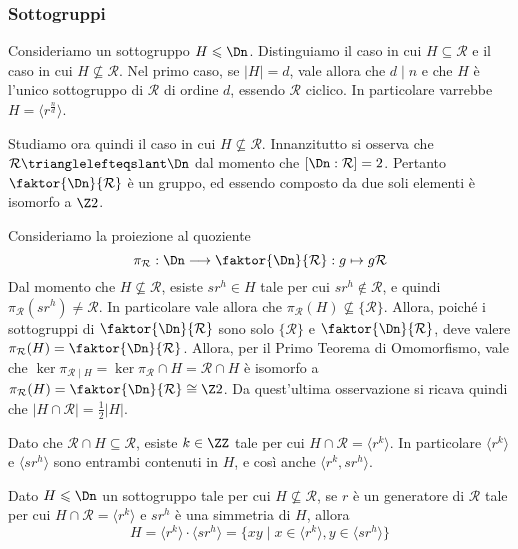 \documentclass[11pt]{scrartcl}
\begin{document}
	
	\subsubsection{Sottogruppi}
	
	Consideriamo un sottogruppo $H\leqslant \Dn$. Distinguiamo il caso
	in cui
	$H \subseteq \mathcal{R}$ e il caso in cui $H \nsubseteq \mathcal{R}$. Nel primo caso,
	se $\lvert H \rvert = d$, vale allora che $d\mid n$ e che $H$ è l'unico sottogruppo di $\mathcal{R}$ di ordine $d$, essendo
	$\mathcal{R}$ ciclico. In particolare varrebbe $H = \langle r^{\frac{n}{d}} \rangle$. \medskip
	
	
	Studiamo ora quindi il caso in cui $H \nsubseteq \mathcal{R}$.
	Innanzitutto si osserva che
	$\mathcal{R}\trianglelefteqslant \Dn$ dal momento che
	$[\Dn : \mathcal{R}] = 2$.
	Pertanto $\faktor{\Dn}{\mathcal{R}}$ è un gruppo, ed essendo
	composto da due soli elementi è isomorfo a
	$\Z2$. \medskip
	
	
	Consideriamo la proiezione al quoziente 
	\[
	\pi_{\mathcal{R}}: \Dn \longrightarrow \faktor{\Dn}{\mathcal{R}} : g \mapsto g\mathcal{R}
	\]
	Dal momento che $H \nsubseteq \mathcal{R}$, esiste $sr^h \in H$ tale per
	cui 
	$sr^h \notin \mathcal{R}$, e quindi $\pi_{\mathcal{R}}(sr^h) \neq \mathcal{R}$.
	In particolare vale allora che $\pi_{\mathcal{R}}(H) \nsubseteq \{\mathcal{R}\}$. Allora, poiché i 
	sottogruppi di $\faktor{\Dn}{\mathcal{R}}$ sono solo $\{\mathcal{R}\}$ e
	$\faktor{\Dn}{\mathcal{R}}$, deve valere $\pi_{\mathcal{R}}(H) = 
	\faktor{\Dn}{\mathcal{R}}$. Allora, per il Primo Teorema
	di Omomorfismo, vale che $\ker \pi_{\mathcal{R}\mid H} = 
	\ker \pi_{\mathcal{R}} \cap H = \mathcal{R} \cap H$ è isomorfo
	a $\pi_{\mathcal{R}}(H) = \faktor{\Dn}{\mathcal{R}} \cong \Z2$.
	Da quest'ultima osservazione si ricava quindi che 
	$\lvert H\cap\mathcal{R} \rvert = \frac 1 2 \lvert H \rvert$. \medskip
	
	
	Dato che $\mathcal{R}\cap H \subseteq
	\mathcal{R}$, esiste $k \in \ZZ$ tale per cui $H\cap\mathcal{R} = \langle r^k\rangle$.
	In particolare $\langle r^k\rangle$ e $\langle sr^h\rangle$ sono
	entrambi contenuti in $H$, e così anche $\langle r^k, sr^h \rangle$. 
	
	\begin{proposition}
		Dato $H\leqslant \Dn$ un sottogruppo tale per cui $H\nsubseteq \mathcal{R}$, se
		$r$ è un generatore di $\mathcal{R}$ tale per cui $H\cap\mathcal{R} = \langle r^k\rangle$ 
		e $s r^h$ è una simmetria di $H$, allora \[
		H = \langle r^k\rangle\cdot\langle sr^h\rangle = \{xy \mid x \in \langle r^k\rangle,
		y \in \langle sr^h\rangle\} \]
	\end{proposition}
	
\end{document}
